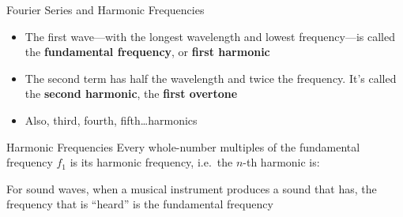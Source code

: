 \documentclass[12pt,aspectratio=169]{beamer}
\newcommand{\eq}[2]{\vspace{#1}{\Large\begin{displaymath}#2\end{displaymath}}}
\begin{document}
\begin{frame}{Fourier Series and Harmonic Frequencies}
  \begin{center}
    \vspace{-.3in}
    \hspace{.15in}
    \hspace{.15in}
  \end{center}

  \vspace{-.2in}
  \begin{itemize}
  \item The first wave---with the longest wavelength and lowest
    frequency---is called the \textbf{fundamental frequency}, or
    \textbf{first harmonic}
  \item The second term has half the wavelength and twice the frequency. It's
    called the \textbf{second harmonic}, the \textbf{first overtone}
  \item Also, third, fourth, fifth\ldots harmonics
  \end{itemize}
\end{frame}



\begin{frame}{Harmonic Frequencies}
    Every whole-number multiples of the fundamental frequency $f_1$ is its
    harmonic frequency, i.e.\ the $n$-th harmonic is:

    \eq{-.25in}{
      \boxed{f_n=nf_1}\quad n=1,2,3,\ldots
    }
    For sound waves, when a musical instrument produces a sound that has, the
    frequency that is ``heard'' is the fundamental frequency
\end{frame}
\end{document}
